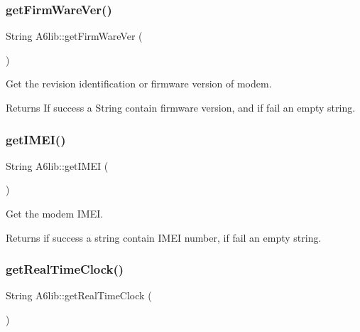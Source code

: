 \mbox{\label{class_a6lib_a92cc2f3cd1f793bf1bf77a3b528aba81}} 
\subsubsection{\texorpdfstring{get\+Firm\+Ware\+Ver()}{getFirmWareVer()}}
{\footnotesize\ttfamily String A6lib\+::get\+Firm\+Ware\+Ver (\begin{DoxyParamCaption}{ }\end{DoxyParamCaption})}

Get the revision identification or firmware version of modem. \begin{DoxyReturn}{Returns}
If success a String contain firmware version, and if fail an empty string. 
\end{DoxyReturn}
\mbox{\label{class_a6lib_a365df3e93f910171da9d5914ae1997c2}} 
\subsubsection{\texorpdfstring{get\+I\+M\+E\+I()}{getIMEI()}}
{\footnotesize\ttfamily String A6lib\+::get\+I\+M\+EI (\begin{DoxyParamCaption}{ }\end{DoxyParamCaption})}

Get the modem I\+M\+EI. \begin{DoxyReturn}{Returns}
if success a string contain I\+M\+EI number, if fail an empty string. 
\end{DoxyReturn}
\mbox{\label{class_a6lib_ab18ee06ead6ceac9716265c0e418b83b}} 
\subsubsection{\texorpdfstring{get\+Real\+Time\+Clock()}{getRealTimeClock()}}
{\footnotesize\ttfamily String A6lib\+::get\+Real\+Time\+Clock (\begin{DoxyParamCaption}{ }\end{DoxyParamCaption})}


